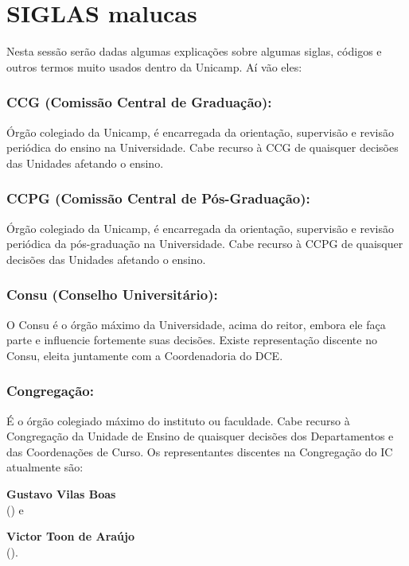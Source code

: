
\section{SIGLAS malucas}

Nesta sessão serão dadas algumas explicações sobre algumas siglas, códigos e
outros termos muito usados dentro da Unicamp. Aí vão eles:

\subsubsection{CCG (Comissão Central de Graduação):} Órgão colegiado da
Unicamp, é encarregada da orientação, supervisão e revisão periódica do ensino
na Universidade. Cabe recurso à CCG de quaisquer decisões das Unidades afetando
o ensino.

\subsubsection{CCPG (Comissão Central de Pós-Graduação):} Órgão colegiado da
Unicamp, é encarregada da orientação, supervisão e revisão periódica da
pós-graduação na Universidade. Cabe recurso à CCPG de quaisquer decisões das
Unidades afetando o ensino.

\subsubsection{Consu (Conselho Universitário):} O Consu é o órgão máximo da
Universidade, acima do reitor, embora ele faça parte e influencie fortemente
suas decisões. Existe representação discente no Consu, eleita juntamente com a
Coordenadoria do DCE.

\subsubsection{Congregação:} É o órgão colegiado máximo do instituto ou
faculdade.  Cabe recurso à Congregação da Unidade de Ensino de quaisquer
decisões dos Departamentos e das Coordenações de Curso. Os representantes
discentes na Congregação do IC atualmente são:

\begin{compactitemize}
\item \textbf{Gustavo Vilas Boas}
  \\() e
\item \textbf{Victor Toon de Araújo}
  \\().
\end{compactitemize}

